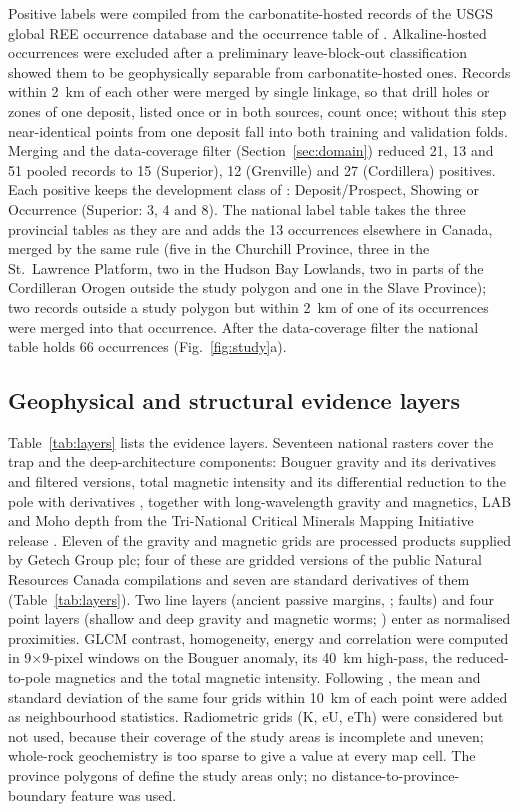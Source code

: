 \documentclass[pdflatex,sn-apa]{sn-jnl}
\begin{document}
Positive labels were compiled from the carbonatite-hosted records of the USGS global REE occurrence database \citep{Orris2018} and the occurrence table of \citet{Parsa2024}. Alkaline-hosted occurrences were excluded after a preliminary leave-block-out classification showed them to be geophysically separable from carbonatite-hosted ones. Records within 2~km of each other were merged by single linkage, so that drill holes or zones of one deposit, listed once or in both sources, count once; without this step near-identical points from one deposit fall into both training and validation folds. Merging and the data-coverage filter (Section~\ref{sec:domain}) reduced 21, 13 and 51 pooled records to 15 (Superior), 12 (Grenville) and 27 (Cordillera) positives. Each positive keeps the development class of \citet{Parsa2024}: Deposit/Prospect, Showing or Occurrence (Superior: 3, 4 and 8). The national label table takes the three provincial tables as they are and adds the 13 occurrences elsewhere in Canada, merged by the same rule (five in the Churchill Province, three in the St.~Lawrence Platform, two in the Hudson Bay Lowlands, two in parts of the Cordilleran Orogen outside the study polygon and one in the Slave Province); two records outside a study polygon but within 2~km of one of its occurrences were merged into that occurrence. After the data-coverage filter the national table holds 66 occurrences (Fig.~\ref{fig:study}a).

\subsection{Geophysical and structural evidence layers}\label{sec:layers}

Table~\ref{tab:layers} lists the evidence layers. Seventeen national rasters cover the trap and the deep-architecture components: Bouguer gravity and its derivatives and filtered versions, total magnetic intensity and its differential reduction to the pole with derivatives \citep{Jobin2017,Miles2016}, together with long-wavelength gravity and magnetics, LAB and Moho depth from the Tri-National Critical Minerals Mapping Initiative release \citep{McCafferty2023}. Eleven of the gravity and magnetic grids are processed products supplied by Getech Group plc; four of these are gridded versions of the public Natural Resources Canada compilations and seven are standard derivatives of them (Table~\ref{tab:layers}). Two line layers (ancient passive margins, \citealp{BradleyDC2008}; faults) and four point layers (shallow and deep gravity and magnetic worms; \citealp{McCafferty2023}) enter as normalised proximities. GLCM contrast, homogeneity, energy and correlation were computed in 9$\times$9-pixel windows on the Bouguer anomaly, its 40~km high-pass, the reduced-to-pole magnetics and the total magnetic intensity. Following \citet{Luo2026}, the mean and standard deviation of the same four grids within 10~km of each point were added as neighbourhood statistics. Radiometric grids (K, eU, eTh) were considered but not used, because their coverage of the study areas is incomplete and uneven; whole-rock geochemistry is too sparse to give a value at every map cell. The province polygons of \citet{Wheeler1996} define the study areas only; no distance-to-province-boundary feature was used.
\end{document}
